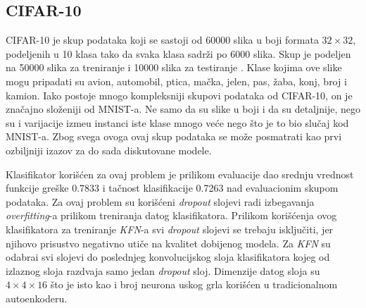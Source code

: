 \documentclass{article}
\begin{document}
	\subsection{CIFAR-10}
	\label{cifar10-section}
	
	CIFAR-10 je skup podataka koji se sastoji od 60000 slika u boji formata $32 \times 32$, podeljenih u 10 klasa tako da svaka klasa sadr\v zi po 6000 slika. 
	Skup je podeljen na 50000 slika za treniranje i 10000 slika za testiranje \cite{cifar10}. 
	Klase kojima ove slike mogu pripadati su avion, automobil, ptica, ma\v cka, jelen, pas, \v zaba, konj, broj i kamion.
	Iako postoje mnogo kompleksniji skupovi podataka od CIFAR-10, on je zna\v cajno slo\v zeniji od MNIST-a.
	Ne samo da su slike u boji i da su detaljnije, nego su i varijacije izme\dj u instanci iste klase mnogo ve\'ce nego \v sto je to bio slu\v caj kod MNIST-a.
	Zbog svega ovoga ovaj skup podataka se mo\v ze posmatrati kao prvi ozbiljniji izazov za do sada diskutovane modele.
	
	Klasifikator kori\v s\'cen za ovaj problem je prilikom evaluacije dao srednju vrednost funkcije gre\v ske 0.7833 i ta\v cnost klasifikacije 0.7263 nad evaluacionim skupom podataka.
	Za ovaj problem su kori\v s\'ceni \emph{dropout} slojevi radi izbegavanja \emph{overfitting}-a prilikom treniranja datog klasifikatora.
	Prilikom kori\v s\'cenja ovog klasifikatora za treniranje \emph{KFN}-a svi \emph{dropout} slojevi se trebaju isklju\v citi, jer njihovo prisustvo negativno uti\v ce na kvalitet dobijenog modela.
	Za \emph{KFN} su odabrai svi slojevi do poslednjeg konvolucijskog sloja klasifikatora kojeg od izlaznog sloja razdvaja samo jedan \emph{dropout} sloj.
	Dimenzije datog sloja su $4 \times 4 \times 16$ \v sto je isto kao i broj neurona uskog grla kori\v s\'cen u tradicionalnom autoenkoderu.
	
\end{document}
